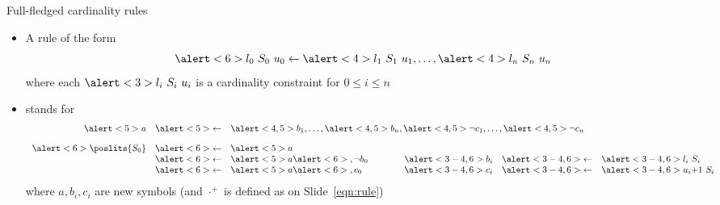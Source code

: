 \begin{frame}{Full-fledged cardinality rules}
  \begin{itemize}
  \item A rule of the form
    \[
    \alert<6>{l_0~S_0~u_0}\leftarrow\alert<4>{l_1~S_1~u_1},\dots,\alert<4>{l_n~S_n~u_n}
    \]
    where each $\alert<3>{l_i~S_i~u_i}$ is a cardinality constraint for $0\leq i\leq n$
  \item<2-> [] stands for %
    \[
    \begin{array}{rclp{20pt}rcl}
            \alert<5>{a}&\alert<5>{\leftarrow}&\multicolumn{5}{l}{\alert<4,5>{b_1},\dots,\alert<4,5>{b_n},\alert<4,5>{\neg
                                                c_1},\dots,\alert<4,5>{\neg c_n}}\\[10pt]
\alert<6>{\poslits{S_0}}&\alert<6>{\leftarrow}&\alert<5>{a}\\
                        &\alert<6>{\leftarrow}&\alert<5>{a}\alert<6>{,\neg b_0}&&\alert<3-4,6>{b_i}&\alert<3-4,6>{\leftarrow}&\alert<3-4,6>{l_i~S_i}\\
                        &\alert<6>{\leftarrow}&\alert<5>{a}\alert<6>{,     c_0 }&&\alert<3-4,6>{c_i}&\alert<3-4,6>{\leftarrow}&\alert<3-4,6>{u_i{+}1~S_i}
    \end{array}
    \]
    where $a,b_i,c_i$ are new symbols (and $\cdot^+$ is defined as on Slide~\ref{eqn:rule})
  \end{itemize}
\end{frame}
